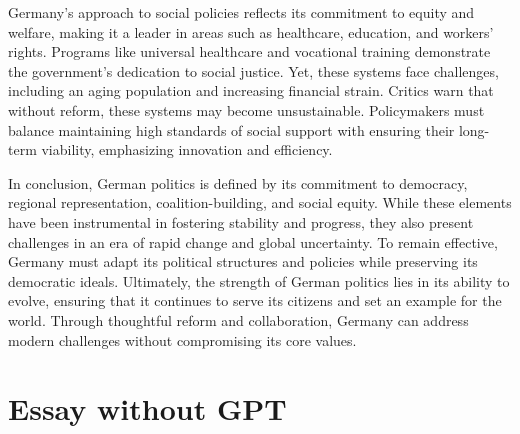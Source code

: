 \documentclass{article}
\begin{document}
Germany’s approach to social policies reflects its commitment to equity and welfare, making it a leader in areas such as healthcare, education, and workers’ rights. Programs like universal healthcare and vocational training demonstrate the government’s dedication to social justice. Yet, these systems face challenges, including an aging population and increasing financial strain. Critics warn that without reform, these systems may become unsustainable. Policymakers must balance maintaining high standards of social support with ensuring their long-term viability, emphasizing innovation and efficiency.

In conclusion, German politics is defined by its commitment to democracy, regional representation, coalition-building, and social equity. While these elements have been instrumental in fostering stability and progress, they also present challenges in an era of rapid change and global uncertainty. To remain effective, Germany must adapt its political structures and policies while preserving its democratic ideals. Ultimately, the strength of German politics lies in its ability to evolve, ensuring that it continues to serve its citizens and set an example for the world. Through thoughtful reform and collaboration, Germany can address modern challenges without compromising its core values.

\newpage
\section{Essay without GPT}
\end{document}
